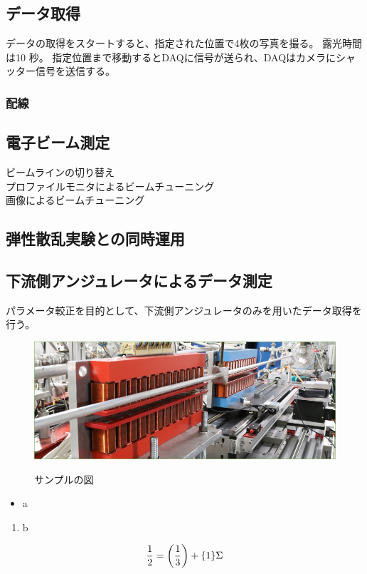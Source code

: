 \documentclass[a4paper,11pt,uplatex]{jsbook}
\begin{document}
\subsection{データ取得}
データの取得をスタートすると、指定された位置で4枚の写真を撮る。
露光時間は10 秒。
指定位置まで移動するとDAQに信号が送られ、DAQはカメラにシャッター信号を送信する。
\subsubsection{配線}

\subsection{電子ビーム測定}

ビームラインの切り替え\\
プロファイルモニタによるビームチューニング\\
画像によるビームチューニング\\

\subsection{弾性散乱実験との同時運用}
\subsection{下流側アンジュレータによるデータ測定}
パラメータ較正を目的として、下流側アンジュレータのみを用いたデータ取得を行う。

\clearpage

\begin{figure}[tb]
  \centering
  \includegraphics[width=0.8\linewidth]{image/1-1.jpg}\\
  \caption{サンプルの図}
  \label{sample_image}
\end{figure}

\begin{itemize}
  \item a
\end{itemize}
\begin{enumerate}
  \item b
\end{enumerate}

\begin{align}
\frac{1}{2} = \qty(\frac{1}{3}) + \qty{1}\Sigma
\end{align}
\end{document}
